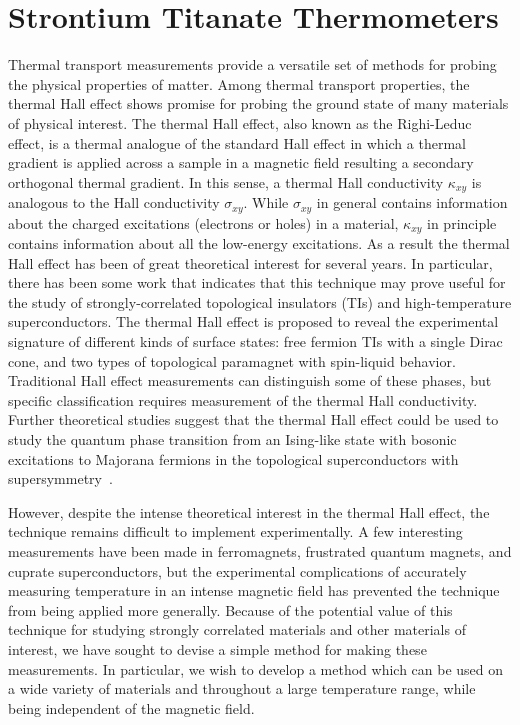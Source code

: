 \documentclass{thesis-umich}
\begin{document}
\section{Strontium Titanate Thermometers}

Thermal transport measurements provide a versatile set of methods for probing
the physical properties of matter. Among thermal transport properties, the
thermal Hall effect shows promise for probing the ground state of many materials
of physical interest.  The thermal Hall effect, also known as the Righi-Leduc
effect,  is a thermal analogue of the standard Hall effect in which a thermal
gradient is applied across a sample in a magnetic field resulting a secondary
orthogonal thermal gradient. In this sense, a thermal Hall conductivity
$\kappa_{xy}$ is analogous to the Hall conductivity $\sigma_{xy}$.  While
$\sigma_{xy}$ in general contains information about the charged excitations
(electrons or holes) in a material, $\kappa_{xy}$ in principle contains
information about all the low-energy excitations. As a result the thermal Hall
effect has been of great theoretical interest for several years. In particular,
there has been some work that indicates that this technique may prove useful for
the study of strongly-correlated topological insulators (TIs) and
high-temperature superconductors. The thermal Hall effect is proposed to reveal
the experimental signature of different kinds of surface states\cite{Wang2014}:
free fermion TIs with a single Dirac cone, and two types of topological
paramagnet with spin-liquid behavior. Traditional Hall effect measurements can
distinguish some of these phases, but specific classification requires
measurement of the thermal Hall conductivity. Further theoretical studies
suggest that the thermal Hall effect could be used to study the quantum phase
transition from an Ising-like state with bosonic excitations to Majorana
fermions in the topological superconductors with supersymmetry~\cite{Grover2014}.

However, despite the intense theoretical interest in the thermal Hall effect,
the technique remains difficult to implement experimentally. A few interesting
measurements have been made in ferromagnets\cite{Onose2010}, frustrated quantum
magnets\cite{Hirschberger2015}, and cuprate superconductors\cite{Cvetkovic2015}, but
the experimental complications of accurately measuring temperature in an intense
magnetic field has prevented the technique from being applied more generally.
Because of the potential value of this technique for studying strongly
correlated materials and other materials of interest, we have sought to devise a
simple method for making these measurements. In particular, we wish to develop a
method which can be used on a wide variety of materials and throughout a large
temperature range, while being independent of the magnetic field.
\end{document}
